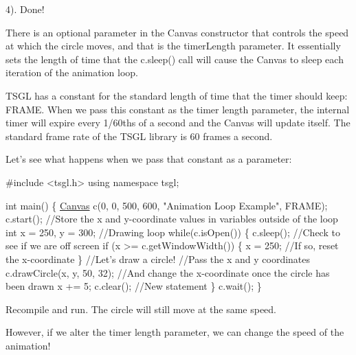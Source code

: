 4). Done!

There is an optional parameter in the Canvas constructor that controls the speed at which the circle moves, and that is the {\ttfamily timer\-Length} parameter. It essentially sets the length of time that the {\ttfamily c.\-sleep()} call will cause the Canvas to sleep each iteration of the animation loop.

T\-S\-G\-L has a constant for the standard length of time that the timer should keep\-: {\ttfamily F\-R\-A\-M\-E}. When we pass this constant as the timer length parameter, the internal timer will expire every 1/60ths of a second and the Canvas will update itself. The standard frame rate of the T\-S\-G\-L library is 60 frames a second.

Let's see what happens when we pass that constant as a parameter\-:


\begin{DoxyCode}
\textcolor{preprocessor}{#include <tsgl.h>}
\textcolor{keyword}{using namespace }tsgl;

\textcolor{keywordtype}{int} main() \{
  \hyperlink{classtsgl_1_1_canvas}{Canvas} c(0, 0, 500, 600, \textcolor{stringliteral}{"Animation Loop Example"}, FRAME);
  c.start();
  \textcolor{comment}{//Store the x and y-coordinate values in variables outside of the loop}
  \textcolor{keywordtype}{int} x = 250, y = 300;
  \textcolor{comment}{//Drawing loop}
  \textcolor{keywordflow}{while}(c.isOpen()) \{
    c.sleep();
    \textcolor{comment}{//Check to see if we are off screen}
    \textcolor{keywordflow}{if} (x >= c.getWindowWidth()) \{
       x = 250; \textcolor{comment}{//If so, reset the x-coordinate}
    \}
    \textcolor{comment}{//Let's draw a circle!}
    \textcolor{comment}{//Pass the x and y coordinates}
    c.drawCircle(x, y, 50, 32);
    \textcolor{comment}{//And change the x-coordinate once the circle has been drawn}
    x += 5;
    c.clear(); \textcolor{comment}{//New statement}
  \}
  c.wait();
\}
\end{DoxyCode}


Recompile and run. The circle will still move at the same speed.

However, if we alter the timer length parameter, we can change the speed of the animation!


